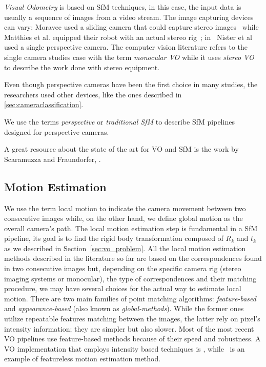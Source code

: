 \textit{Visual Odometry} is based on SfM techniques, 
in this case, the input data is usually a sequence 
of images from a video stream. The image capturing devices can vary:
Moravec used a sliding camera that could capture stereo images~\cite{moravec1980obstacle} while Matthies et al. equipped their robot with
an actual stereo rig~\cite{matthies1987error};
in~\cite{nister2004visual} Nister et al used a single perspective camera.
The computer vision literature refers to the
single camera studies case with the term \textit{monocular VO} while it uses \textit{stereo VO} to describe the work done with stereo equipment.

Even though perspective cameras have been the first choice in many studies, 
the researchers used other devices, like the ones described in 
\ref{sec:cameraclassification}.

We use the terms \textit{perspective} or \textit{traditional SfM} to describe 
SfM pipelines designed for perspective cameras.

A great resource about the state of the art for VO and SfM is the work by Scaramuzza and Fraundorfer,  
\cite{scaramuzzaVisualOdometryI, scaramuzzaVisualOdometryII}.

\subsection{Motion Estimation}
\label{subsec:motion_estimation}
We use the term local motion to indicate the camera movement between two 
consecutive images while, on the other hand, we define global motion as
the overall camera's path.
The local motion estimation step is fundamental in a SfM pipeline, its goal is 
to find the rigid body transformation composed of $R_k$ and $t_k$ as we 
described in Section~\ref{sec:vo_problem}.
All the local motion estimation methods described in the literature so far are 
based on the correspondences found in two consecutive images but, depending on the
specific camera rig (stereo imaging systems or monocular), the type of 
correspondences and their matching procedure, we may have several choices for
the actual way to estimate local motion.
There are two main families of point matching algorithms: \textit{feature-based}
and \textit{appearance-based} (also known as \textit{global-methods}).
While the former ones utilize repeatable features 
matching between the images, the latter rely on pixel's intensity information; 
they are simpler but also slower. Most of the 
most recent VO pipelines use feature-based methods because of
their speed and robustness.
A VO implementation that employs intensity based techniques is 
\cite{nister2004visual}, while~\cite{makadia2007correspondence} is an example 
of featureless motion estimation method.

